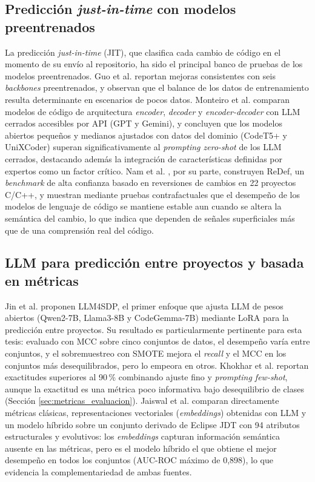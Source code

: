 \subsection{Predicción \textit{just-in-time} con modelos preentrenados}

La predicción \textit{just-in-time} (JIT), que clasifica cada cambio de código en el momento de su envío al repositorio, ha sido el principal banco de pruebas de los modelos preentrenados. Guo et al. \cite{guo2023} reportan mejoras consistentes con seis \textit{backbones} preentrenados, y observan que el balance de los datos de entrenamiento resulta determinante en escenarios de pocos datos. Monteiro et al. \cite{monteiro2026jit} comparan modelos de código de arquitectura \textit{encoder}, \textit{decoder} y \textit{encoder-decoder} con LLM cerrados accesibles por API (GPT y Gemini), y concluyen que los modelos abiertos pequeños y medianos ajustados con datos del dominio (CodeT5+ y UniXCoder) superan significativamente al \textit{prompting zero-shot} de los LLM cerrados, destacando además la integración de características definidas por expertos como un factor crítico. Nam et al. \cite{nam2026}, por su parte, construyen ReDef, un \textit{benchmark} de alta confianza basado en reversiones de cambios en 22 proyectos C/C++, y muestran mediante pruebas contrafactuales que el desempeño de los modelos de lenguaje de código se mantiene estable aun cuando se altera la semántica del cambio, lo que indica que dependen de señales superficiales más que de una comprensión real del código.

\subsection{LLM para predicción entre proyectos y basada en métricas}

Jin et al. \cite{jin2025llm4sdp} proponen LLM4SDP, el primer enfoque que ajusta LLM de pesos abiertos (Qwen2-7B, Llama3-8B y CodeGemma-7B) mediante LoRA para la predicción entre proyectos. Su resultado es particularmente pertinente para esta tesis: evaluado con MCC sobre cinco conjuntos de datos, el desempeño varía entre conjuntos, y el sobremuestreo con SMOTE mejora el \textit{recall} y el MCC en los conjuntos más desequilibrados, pero lo empeora en otros. Khokhar et al. \cite{khokhar2025finetuned} reportan exactitudes superiores al 90\,\% combinando ajuste fino y \textit{prompting few-shot}, aunque la exactitud es una métrica poco informativa bajo desequilibrio de clases (Sección \ref{sec:metricas_evaluacion}). Jaiswal et al. \cite{jaiswal2026llm} comparan directamente métricas clásicas, representaciones vectoriales (\textit{embeddings}) obtenidas con LLM y un modelo híbrido sobre un conjunto derivado de Eclipse JDT con 94 atributos estructurales y evolutivos: los \textit{embeddings} capturan información semántica ausente en las métricas, pero es el modelo híbrido el que obtiene el mejor desempeño en todos los conjuntos (AUC-ROC máximo de 0,898), lo que evidencia la complementariedad de ambas fuentes.

